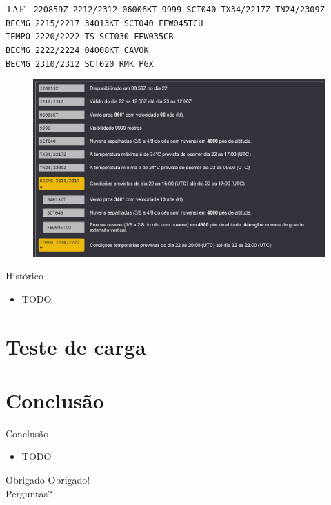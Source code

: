 \documentclass{beamer}
\begin{document}
\begin{frame}{TAF}
    \footnotesize{\texttt{
220859Z 2212/2312 06006KT 9999 SCT040 TX34/2217Z TN24/2309Z \\
    BECMG 2215/2217 34013KT SCT040 FEW045TCU \\
    TEMPO 2220/2222 TS SCT030 FEW035CB \\
    BECMG 2222/2224 04008KT CAVOK \\
    BECMG 2310/2312 SCT020 RMK PGX}}

  \begin{figure}[ht]
    \begin{center}
    \includegraphics[width=0.7\linewidth]{img/TAF-SBBE.png}
    \label{fig:UI}
    \end{center}
\end{figure}
\end{frame}

\begin{frame}{Histórico}
    \begin{itemize}
        \item TODO
    \end{itemize}
\end{frame}

\section{Teste de carga}

\section{Conclusão}

\begin{frame}{Conclusão}
    \begin{itemize}
        \item TODO
    \end{itemize}
\end{frame}

\begin{frame}{Obrigado}
    \centering
    \Huge Obrigado! \\
    \normalsize Perguntas?
\end{frame}
\end{document}
